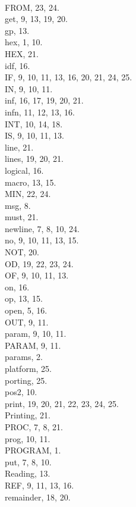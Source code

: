 \:\\{FROM}, 23, 24.
\:\\{get}, 9, 13, 19, 20.
\:\\{gp}, 13.
\:\\{hex}, 1, 10.
\:\\{HEX}, 21.
\:\\{idf}, 16.
\:\\{IF}, 9, 10, 11, 13, 16, 20, 21, 24, 25.
\:\\{IN}, 9, 10, 11.
\:\\{inf}, 16, 17, 19, 20, 21.
\:\\{infn}, 11, 12, 13, 16.
\:\\{INT}, 10, 14, 18.
\:\\{IS}, 9, 10, 11, 13.
\:\\{line}, 21.
\:\\{lines}, 19, 20, 21.
\:\\{logical}, 16.
\:\\{macro}, 13, 15.
\:\\{MIN}, 22, 24.
\:\\{msg}, 8.
\:\\{must}, 21.
\:\\{newline}, 7, 8, 10, 24.
\:\\{no}, 9, 10, 11, 13, 15.
\:\\{NOT}, 20.
\:\\{OD}, 19, 22, 23, 24.
\:\\{OF}, 9, 10, 11, 13.
\:\\{on}, 16.
\:\\{op}, 13, 15.
\:\\{open}, 5, 16.
\:\\{OUT}, 9, 11.
\:\\{param}, 9, 10, 11.
\:\\{PARAM}, 9, 11.
\:\\{params}, 2.
\:\\{platform}, 25.
\:\\{porting}, 25.
\:\\{pos2}, 10.
\:\\{print}, 19, 20, 21, 22, 23, 24, 25.
\:\\{Printing}, 21.
\:\\{PROC}, 7, 8, 21.
\:\\{prog}, 10, 11.
\:\\{PROGRAM}, 1.
\:\\{put}, 7, 8, 10.
\:\\{Reading}, 13.
\:\\{REF}, 9, 11, 13, 16.
\:\\{remainder}, 18, 20.
